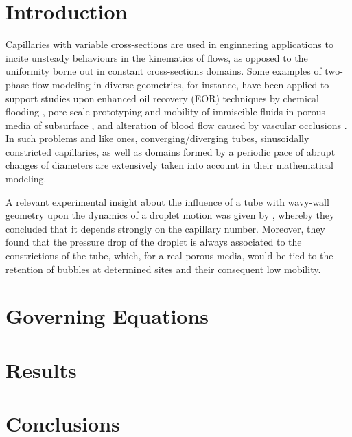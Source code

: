 \documentclass[12pt,fleqn]{article}
\begin{document}
\section{Introduction}

Capillaries with variable cross-sections are used in enginnering
applications to incite unsteady behaviours in the kinematics of flows, as
opposed to the uniformity borne out in constant cross-sections
domains. Some examples of two-phase flow modeling in diverse geometries,
for instance, have been applied to support studies upon enhanced oil
recovery (EOR) techniques by chemical flooding \cite{Olbricht1996},
pore-scale prototyping and mobility of immiscible fluids in porous media of 
subsurface \cite{Hemmat1996}, and alteration of blood flow caused by
vascular occlusions \cite{Forsester1970}. In such problems and like ones,
converging/diverging tubes, sinusoidally constricted capillaries, as
well as domains formed by a periodic pace of abrupt changes of diameters
are extensively taken into account in their mathematical modeling.

A relevant experimental insight about the influence of a tube with
wavy-wall geometry upon the dynamics of a droplet motion was given by
\cite{OlbrichtAndLeal1983}, whereby they concluded that it depends
strongly on the capillary number. Moreover, they found that the pressure
drop of the droplet is always associated to the constrictions of the
tube, which, for a real porous media, would be tied to the retention of
bubbles at determined sites and their consequent low mobility.




\section{Governing Equations}
\section{Results}
\section{Conclusions}



\end{document}
